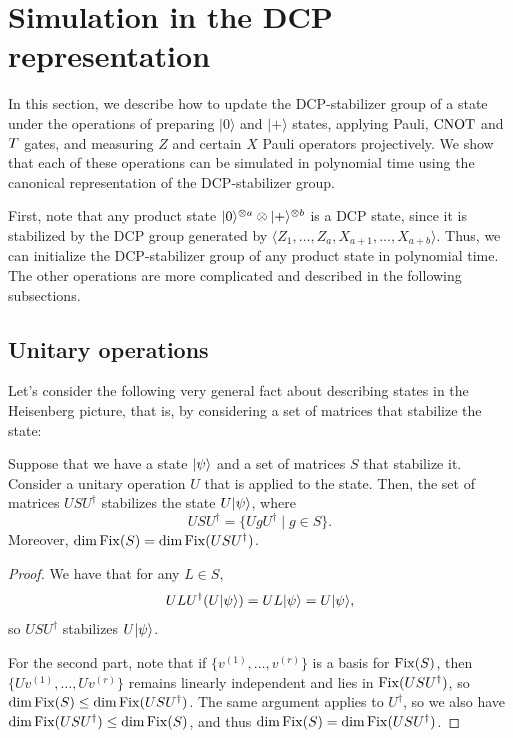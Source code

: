 \section{Simulation in the DCP representation}\label{sec:simulator-dcp-representation}
In this section, we describe how to update the DCP-stabilizer group of a state under the operations of preparing $|0\rangle$ and $|+\rangle$ states, applying Pauli, $\operatorname{CNOT}$ and $T$ gates, and measuring $Z$ and certain $X$ Pauli operators projectively. We show that each of these operations can be simulated in polynomial time using the canonical representation of the DCP-stabilizer group.

First, note that any product state $|0\rangle^{\otimes a} \otimes |+\rangle^{\otimes b}$ is a DCP state, since it is stabilized by the DCP group generated by $\langle Z_1,\dots,Z_a, X_{a+1},\dots,X_{a+b} \rangle$. Thus, we can initialize the DCP-stabilizer group of any product state in polynomial time. The other operations are more complicated and described in the following subsections.

\subsection{Unitary operations}
Let's consider the following very general fact about describing states in the Heisenberg picture, that is, by considering a set of matrices that stabilize the state:
\begin{proposition}\label{prop:heisenberg}
    Suppose that we have a state $|\psi\rangle$ and a set of matrices $S$ that stabilize it. Consider a unitary operation $U$ that is applied to the state. Then, the set of matrices $U S U^\dagger$ stabilizes the state $U|\psi\rangle$, where
    \[
        U S U^\dagger = \{ U g U^\dagger \mid g \in S \}.
    \]
    Moreover, $\dim \operatorname{Fix}(S) = \dim \operatorname{Fix}(U S U^\dagger)$.
\end{proposition}
\begin{proof}
    We have that for any $L \in S$,
    \[
        U L U^\dagger (U |\psi\rangle) = U L |\psi\rangle = U |\psi\rangle,
    \]
    so $U S U^\dagger$ stabilizes $U|\psi\rangle$.

    For the second part, note that if $\{v^{(1)}, \dots, v^{(r)}\}$ is a basis for $\operatorname{Fix}(S)$, then $\{U v^{(1)}, \dots, U v^{(r)}\}$ remains linearly independent and lies in $\operatorname{Fix}(U S U^\dagger)$, so $\dim \operatorname{Fix}(S) \le \dim \operatorname{Fix}(U S U^\dagger)$. The same argument applies to $U^\dagger$, so we also have $\dim \operatorname{Fix}(U S U^\dagger) \le \dim \operatorname{Fix}(S)$, and thus $\dim \operatorname{Fix}(S) = \dim \operatorname{Fix}(U S U^\dagger)$.
\end{proof}

